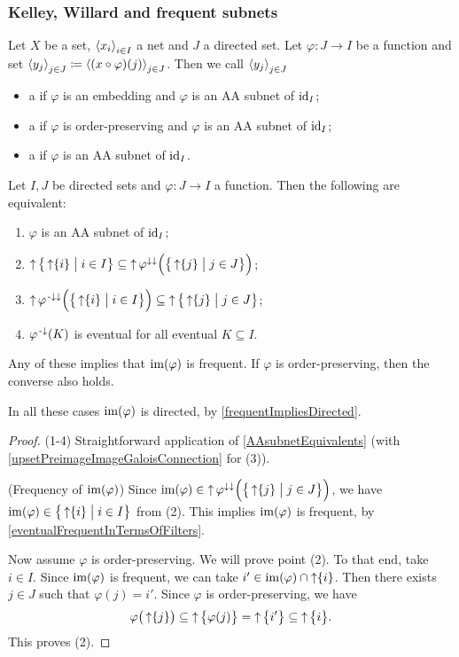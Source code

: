 \subsubsection{Kelley, Willard and frequent subnets}
\begin{definition}
Let $X$ be a set, $\left\langle x_i \right\rangle_{i\in I}$ a net and $J$ a directed set. Let $\varphi: J\to I$ be a function and set $\left\langle y_j \right\rangle_{j\in J} \coloneqq \left\langle (x\circ \varphi)(j) \right\rangle_{j\in J}$. Then we call $\left\langle y_j \right\rangle_{j\in J}$
\begin{itemize}
\item a  if $\varphi$ is an embedding and $\varphi$ is an AA subnet of $\operatorname{id}_I$;
\item a  if $\varphi$ is order-preserving and $\varphi$ is an AA subnet of $\operatorname{id}_I$;
\item a  if $\varphi$ is an AA subnet of $\operatorname{id}_I$.
\end{itemize}
\end{definition}

\begin{lemma} \label{indexMappingSubnet}
Let $I,J$ be directed sets and $\varphi: J\to I$ a function. Then the following are equivalent:
\begin{enumerate}
\item $\varphi$ is an AA subnet of $\operatorname{id}_I$;
\item $\upset\setbuilder[\big]{\upset\{i\}}{i\in I} \subseteq \upset \varphi^{\imf\imf}\Big(\setbuilder[\big]{\upset\{j\}}{j\in J}\Big)$;
\item $\upset\varphi^{\preimf\imf}\Big(\setbuilder[\big]{\upset\{i\}}{i\in I}\Big) \subseteq \upset \setbuilder[\big]{\upset\{j\}}{j\in J}$;
\item $\varphi^{\text{\hspace{0.15em}-}\downarrow}(K)$ is eventual for all eventual $K\subseteq I$.
\end{enumerate}
Any of these implies that $\operatorname{im}(\varphi)$ is frequent. If $\varphi$ is order-preserving, then the converse also holds.
\end{lemma}
In all these cases $\operatorname{im}(\varphi)$ is directed, by \ref{frequentImpliesDirected}.
\begin{proof}
(1-4) Straightforward application of \ref{AAsubnetEquivalents} (with \ref{upsetPreimageImageGaloisConnection} for (3)).

(Frequency of $\operatorname{im}(\varphi)$) Since $\im(\varphi) \in \upset \varphi^{\imf\imf}\Big(\setbuilder[\big]{\upset\{j\}}{j\in J}\Big)$, we have $\im(\varphi) \in \setbuilder[\big]{\upset\{i\}}{i\in I}$ from (2). This implies $\operatorname{im}(\varphi)$ is frequent, by \ref{eventualFrequentInTermsOfFilters}.

Now assume $\varphi$ is order-preserving. We will prove point (2). To that end, take $i\in I$. Since $\operatorname{im}(\varphi)$ is frequent, we can take $i'\in \operatorname{im}(\varphi)\cap \operatorname{\uparrow}\{i\}$. Then there exists $j\in J$ such that $\varphi(j) = i'$. Since $\varphi$ is order-preserving, we have
\[ \varphi\big(\operatorname{\uparrow} \{j\}\big) \subseteq \operatorname{\uparrow} \big\{\varphi(j)\big\} = \operatorname{\uparrow} \big\{i'\big\} \subseteq \operatorname{\uparrow} \big\{i\big\}. \]
This proves (2).
\end{proof}


